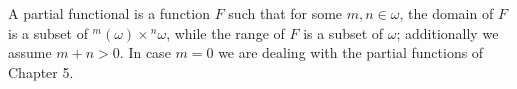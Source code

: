 A partial functional is a function $F$ such that for some $m, n \in \omega$, the domain of $F$ is a subset of ${}^m(\omega) \times {}^n\omega$, while the range of $F$ is a subset of $\omega$; additionally we assume $m + n > 0$. In case $m = 0$ we are dealing with the partial functions of Chapter 5.